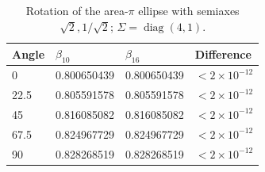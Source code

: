 \begin{table}[htbp]
\centering
\caption{Rotation of the area-$\pi$ ellipse with semiaxes $\sqrt{2},1/\sqrt{2}$; $\Sigma=\operatorname{diag}(4,1)$.}
\label{tab:anisotropy}
\begin{tabular}{llll}
\toprule
Angle & $\beta_{10}$ & $\beta_{16}$ & Difference \\
\midrule
0 & 0.800650439 & 0.800650439 & $<2\times10^{-12}$ \\
22.5 & 0.805591578 & 0.805591578 & $<2\times10^{-12}$ \\
45 & 0.816085082 & 0.816085082 & $<2\times10^{-12}$ \\
67.5 & 0.824967729 & 0.824967729 & $<2\times10^{-12}$ \\
90 & 0.828268519 & 0.828268519 & $<2\times10^{-12}$ \\
\bottomrule
\end{tabular}
\end{table}
